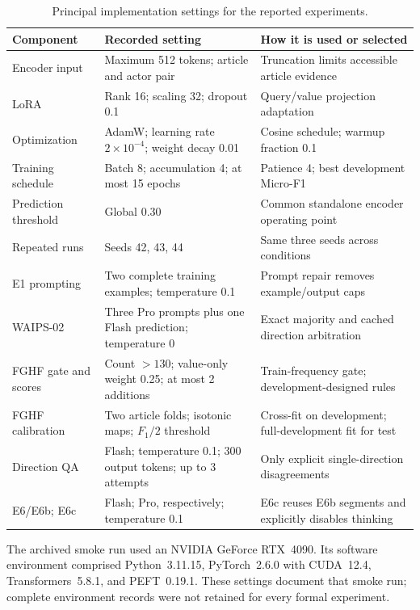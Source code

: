 \documentclass[12pt,a4paper]{article}
\begin{document}
\begin{table}[htbp]
\centering\small
\caption{Principal implementation settings for the reported experiments.}
\label{tab:settings}
\begin{tabularx}{\textwidth}{@{}P{3.25cm}YY@{}}
\toprule
Component & Recorded setting & How it is used or selected \\
\midrule
Encoder input & Maximum 512 tokens; article and actor pair & Truncation limits accessible article evidence \\
LoRA & Rank 16; scaling 32; dropout 0.1 & Query/value projection adaptation \\
Optimization & AdamW; learning rate $2\times10^{-4}$; weight decay 0.01 & Cosine schedule; warmup fraction 0.1 \\
Training schedule & Batch 8; accumulation 4; at most 15 epochs & Patience 4; best development Micro-F1 \\
Prediction threshold & Global 0.30 & Common standalone encoder operating point \\
Repeated runs & Seeds 42, 43, 44 & Same three seeds across conditions \\
E1 prompting & Two complete training examples; temperature 0.1 & Prompt repair removes example/output caps \\
WAIPS-02 & Three Pro prompts plus one Flash prediction; temperature 0 & Exact majority and cached direction arbitration \\
FGHF gate and scores & Count $>130$; value-only weight 0.25; at most 2 additions & Train-frequency gate; development-designed rules \\
FGHF calibration & Two article folds; isotonic maps; $F_1/2$ threshold & Cross-fit on development; full-development fit for test \\
Direction QA & Flash; temperature 0.1; 300 output tokens; up to 3 attempts & Only explicit single-direction disagreements \\
E6/E6b; E6c & Flash; Pro, respectively; temperature 0.1 & E6c reuses E6b segments and explicitly disables thinking \\
\bottomrule
\end{tabularx}
\end{table}

The archived smoke run used an NVIDIA GeForce RTX~4090. Its software environment comprised Python~3.11.15, PyTorch~2.6.0 with CUDA~12.4, Transformers~5.8.1, and PEFT~0.19.1. These settings document that smoke run; complete environment records were not retained for every formal experiment.
\end{document}
